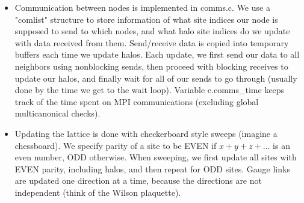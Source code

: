 \documentclass[11pt,a4paper]{article}
\begin{document}
\begin{itemize}
	\item Communication between nodes is implemented in comms.c. We use a "comlist" structure to store information of what site indices our node is supposed to send to which nodes, and what halo site indices do we update with data received from them. Send/receive data is copied into temporary buffers each time we update halos. Each update, we first send our data to all neighbors using nonblocking sends, then proceed with blocking receives to update our halos, and finally wait for all of our sends to go through (usually done by the time we get to the wait loop). Variable c.comms\_time keeps track of the time spent on MPI communications (excluding global multicanonical checks).
	
	\item Updating the lattice is done with checkerboard style sweeps (imagine a chessboard). We specify parity of a site to be EVEN if $x + y + z + \dots $ is an even number, ODD otherwise. When sweeping, we first update all sites with EVEN parity, including halos, and then repeat for ODD sites. Gauge links are updated one direction at a time, because the directions are not independent (think of the Wilson plaquette).  
	
	
\end{itemize}
\end{document}
